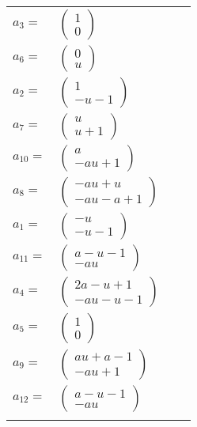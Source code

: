 \documentclass[1p]{elsarticle_modified}
\theoremstyle{definition}
\begin{document}
\begin{tabular}{m{7pt} m{180pt} m{7pt} m{180pt} }
\flushright $a_{3}=$&$\begin{pmatrix}1\\0\end{pmatrix}$ \\
\flushright $a_{6}=$&$\begin{pmatrix}0\\u\end{pmatrix}$ \\
\flushright $a_{2}=$&$\begin{pmatrix}1\\- u-1\end{pmatrix}$ \\
\flushright $a_{7}=$&$\begin{pmatrix}u\\u+1\end{pmatrix}$ \\
\flushright $a_{10}=$&$\begin{pmatrix}a\\- a u+1\end{pmatrix}$ \\
\flushright $a_{8}=$&$\begin{pmatrix}- a u+u\\- a u- a+1\end{pmatrix}$ \\
\flushright $a_{1}=$&$\begin{pmatrix}- u\\- u-1\end{pmatrix}$ \\
\flushright $a_{11}=$&$\begin{pmatrix}a- u-1\\- a u\end{pmatrix}$ \\
\flushright $a_{4}=$&$\begin{pmatrix}2 a- u+1\\- a u- u-1\end{pmatrix}$ \\
\flushright $a_{5}=$&$\begin{pmatrix}1\\0\end{pmatrix}$ \\
\flushright $a_{9}=$&$\begin{pmatrix}a u+a-1\\- a u+1\end{pmatrix}$ \\
\flushright $a_{12}=$&$\begin{pmatrix}a- u-1\\- a u\end{pmatrix}$\\&\end{tabular}
\end{document}

